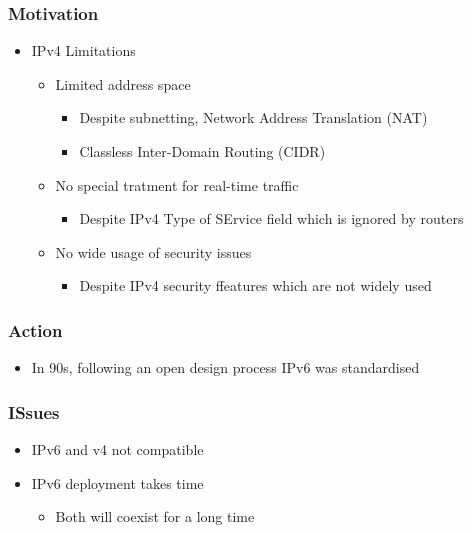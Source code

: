 \documentclass[a4paper]{article}
\begin{document}
\subsubsection{Motivation}
\begin{itemize}
	\item IPv4 Limitations
	\begin{itemize}
		\item Limited address space
		\begin{itemize}
			\item Despite subnetting, Network Address
				Translation (NAT)
			\item Classless Inter-Domain Routing (CIDR)
		\end{itemize}
		\item No special tratment for real-time traffic
		\begin{itemize}
			\item Despite IPv4 Type of SErvice field which is
				ignored by routers
		\end{itemize}
		\item No wide usage of security issues
		\begin{itemize}
			\item Despite IPv4 security ffeatures which are not
				widely used
		\end{itemize}
	\end{itemize}
\end{itemize}
\subsubsection{Action}
\begin{itemize}
	\item In 90s, following an open design process IPv6 was standardised
\end{itemize}
\subsubsection{ISsues}
\begin{itemize}
	\item IPv6 and v4 not compatible
	\item IPv6 deployment takes time
	\begin{itemize}
		\item Both will coexist for a long time
	\end{itemize}
\end{itemize}
\end{document}
